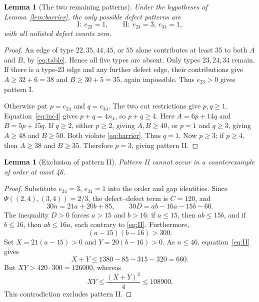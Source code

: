 \documentclass[11pt]{amsart}
\newtheorem{lemma}[theorem]{Lemma}
\theoremstyle{definition}
\theoremstyle{remark}
\begin{document}
\begin{lemma}[The two remaining patterns]\label{lem:patterns}
Under the hypotheses of Lemma~\ref{lem:barrier}, the only possible defect patterns are
\[
 \mathrm{I}:\ e_{23}=1,
 \qquad
 \mathrm{II}:\ e_{24}=3,\ e_{34}=1,
\]
with all unlisted defect counts zero.
\end{lemma}
\begin{proof}
An edge of type $22,35,44,45$, or $55$ alone contributes at least 35 to both $A$ and $B$, by \eqref{eq:table}. Hence all five types are absent. Only types $23,24,34$ remain. If there is a type-$23$ edge and any further defect edge, their contributions give $A\ge32+6=38$ and $B\ge30+5=35$, again impossible. Thus $e_{23}>0$ gives pattern I.

Otherwise put $p=e_{24}$ and $q=e_{34}$. The two cut restrictions give $p,q\ge1$. Equation~\eqref{eq:inc4} gives $p+q=4n_4$, so $p+q\ge4$. Here $A=6p+14q$ and $B=5p+15q$. If $q\ge2$, either $p\ge2$, giving $A,B\ge40$, or $p=1$ and $q\ge3$, giving $A\ge48$ and $B\ge50$. Both violate \eqref{eq:barrier}. Thus $q=1$. Now $p\ge3$; if $p\ge4$, then $A\ge38$ and $B\ge35$. Therefore $p=3$, giving pattern II.
\end{proof}

\begin{lemma}[Exclusion of pattern II]\label{lem:II}
Pattern II cannot occur in a counterexample of order at most 46.
\end{lemma}
\begin{proof}
Substitute $e_{24}=3$, $e_{34}=1$ into the order and gap identities. Since $\Psi((2,4),(3,4))=2/3$, the defect--defect term is $C=120$, and
\begin{equation}\label{eq:II}
 30n=21a+20b+85,\qquad 30D=ab-16a-15b-60.
\end{equation}
The inequality $D>0$ forces $a>15$ and $b>16$: if $a\le15$, then $ab\le15b$, and if $b\le16$, then $ab\le16a$, each contrary to \eqref{eq:II}. Furthermore,
\[
 (a-15)(b-16)>300.
\]
Set $X=21(a-15)>0$ and $Y=20(b-16)>0$. As $n\le46$, equation~\eqref{eq:II} gives
\[
 X+Y\le1380-85-315-320=660.
\]
But $XY>420\cdot300=126000$, whereas
\[
 XY\le\frac{(X+Y)^2}{4}\le108900.
\]
This contradiction excludes pattern II.
\end{proof}
\end{document}
